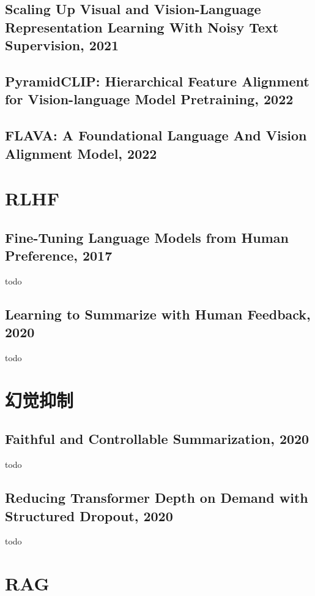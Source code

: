 \documentclass[twocolumn, 10pt]{article} %
\begin{document}
\subsection{Scaling Up Visual and Vision-Language Representation Learning With Noisy Text Supervision, 2021}

\subsection{PyramidCLIP: Hierarchical Feature Alignment for Vision-language Model Pretraining, 2022}


\subsection{FLAVA: A Foundational Language And Vision Alignment Model, 2022}











\section{RLHF}
\subsection{Fine-Tuning Language Models from Human Preference, 2017}
todo


\subsection{Learning to Summarize with Human Feedback, 2020}
todo


\section{幻觉抑制}
\subsection{Faithful and Controllable Summarization, 2020}
todo

\subsection{Reducing Transformer Depth on Demand with Structured Dropout, 2020}
todo


\section{RAG}
\end{document}
